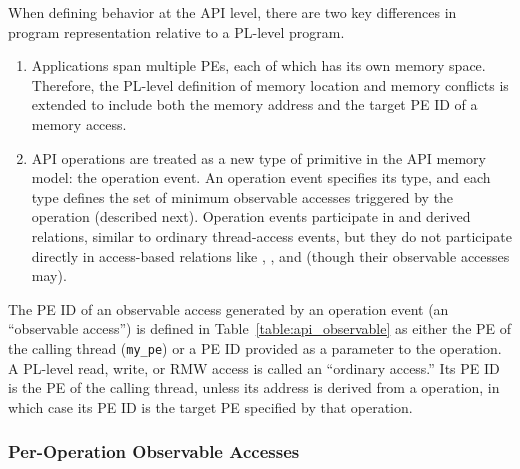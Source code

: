 When defining behavior at the \openshmem API level, there are two key differences in
    program representation relative to a PL-level program.
\begin{enumerate}
    \item Applications span multiple \acp{PE}, each of which has its own memory space.
        Therefore, the PL-level definition of memory location and memory conflicts is
        extended to include both the memory address and the target \ac{PE} ID of a
        memory access.
    \item \openshmem API operations are treated as a new type of primitive in the API
        memory model: the operation event. An operation event specifies its type, and
        each type defines the set of minimum observable accesses triggered by the
        operation (described next). Operation events participate in \relSB{} and derived
        relations, similar to ordinary thread-access events, but they do not participate
        directly in access-based relations like \relMO{}, \relRF{}, and \relSW{} (though
        their observable accesses may).
\end{enumerate}

The \ac{PE} ID of an observable access generated by an operation event (an ``observable
    access'') is defined in Table~\ref{table:api_observable} as either the \ac{PE} of
    the calling thread (\texttt{my\_pe}) or a \ac{PE} ID provided as a parameter to the
    operation.
A PL-level read, write, or RMW access is called an ``ordinary access.'' Its \ac{PE} ID
    is the \ac{PE} of the calling thread, unless its address is derived from a
     operation, in which case its \ac{PE} ID is the target \ac{PE}
    specified by that operation.

\subsubsection{Per-Operation Observable Accesses}\label{subsubsec:api_observable}

